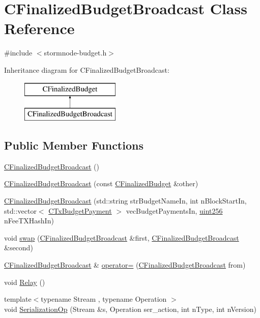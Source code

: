 \hypertarget{class_c_finalized_budget_broadcast}{}\section{C\+Finalized\+Budget\+Broadcast Class Reference}
\label{class_c_finalized_budget_broadcast}


{\ttfamily \#include $<$stormnode-\/budget.\+h$>$}

Inheritance diagram for C\+Finalized\+Budget\+Broadcast\+:\begin{figure}[H]
\begin{center}
\leavevmode
\includegraphics[height=2.000000cm]{class_c_finalized_budget_broadcast}
\end{center}
\end{figure}
\subsection*{Public Member Functions}
\begin{DoxyCompactItemize}
\item 
\hyperlink{class_c_finalized_budget_broadcast_a3d89b0b5358a37cff1c1b549c910681f}{C\+Finalized\+Budget\+Broadcast} ()
\item 
\hyperlink{class_c_finalized_budget_broadcast_a0fc9903afc9a1ccfc7008f0bb95ba26e}{C\+Finalized\+Budget\+Broadcast} (const \hyperlink{class_c_finalized_budget}{C\+Finalized\+Budget} \&other)
\item 
\hyperlink{class_c_finalized_budget_broadcast_a800780793836750ec3c848e87fb397a7}{C\+Finalized\+Budget\+Broadcast} (std\+::string str\+Budget\+Name\+In, int n\+Block\+Start\+In, std\+::vector$<$ \hyperlink{class_c_tx_budget_payment}{C\+Tx\+Budget\+Payment} $>$ vec\+Budget\+Payments\+In, \hyperlink{classuint256}{uint256} n\+Fee\+T\+X\+Hash\+In)
\item 
void \hyperlink{class_c_finalized_budget_broadcast_ac9e99f471d82a9c2d76137a758740315}{swap} (\hyperlink{class_c_finalized_budget_broadcast}{C\+Finalized\+Budget\+Broadcast} \&first, \hyperlink{class_c_finalized_budget_broadcast}{C\+Finalized\+Budget\+Broadcast} \&second)
\item 
\hyperlink{class_c_finalized_budget_broadcast}{C\+Finalized\+Budget\+Broadcast} \& \hyperlink{class_c_finalized_budget_broadcast_afccbdda2d00c695c63802db0fda2d489}{operator=} (\hyperlink{class_c_finalized_budget_broadcast}{C\+Finalized\+Budget\+Broadcast} from)
\item 
void \hyperlink{class_c_finalized_budget_broadcast_abb4cfac3327e7cb912b368054d23fc9c}{Relay} ()
\item 
{\footnotesize template$<$typename Stream , typename Operation $>$ }\\void \hyperlink{class_c_finalized_budget_broadcast_a2c9bac4bb653dbae4c3861fd12380dcd}{Serialization\+Op} (Stream \&s, Operation ser\+\_\+action, int n\+Type, int n\+Version)
\end{DoxyCompactItemize}
